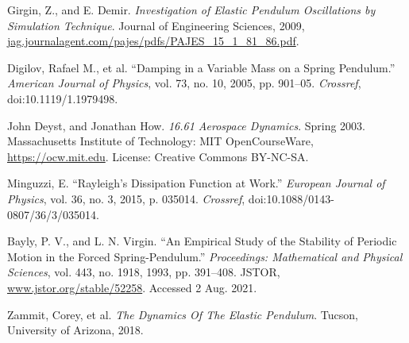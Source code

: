 
\begin{thebibliography}{99}

Girgin, Z., and E. Demir. \emph{Investigation of Elastic Pendulum Oscillations by Simulation Technique}. Journal of Engineering Sciences, 2009, \url{jag.journalagent.com/pajes/pdfs/PAJES_15_1_81_86.pdf}.

Digilov, Rafael M., et al. “Damping in a Variable Mass on a Spring Pendulum.” \emph{American Journal of Physics}, vol. 73, no. 10, 2005, pp. 901–05. \emph{Crossref}, doi:10.1119/1.1979498.

John Deyst, and Jonathan How. \emph{16.61 Aerospace Dynamics}. Spring 2003. Massachusetts Institute of Technology: MIT OpenCourseWare, \url{https://ocw.mit.edu}. License: Creative Commons BY-NC-SA.

Minguzzi, E. “Rayleigh’s Dissipation Function at Work.” \emph{European Journal of Physics}, vol. 36, no. 3, 2015, p. 035014. \emph{Crossref}, doi:10.1088/0143-0807/36/3/035014.

Bayly, P. V., and L. N. Virgin. “An Empirical Study of the Stability of Periodic Motion in the Forced Spring-Pendulum.” \emph{Proceedings: Mathematical and Physical Sciences}, vol. 443, no. 1918, 1993, pp. 391–408. JSTOR, \url{www.jstor.org/stable/52258}. Accessed 2 Aug. 2021.



Zammit, Corey, et al. \emph{The Dynamics Of The Elastic Pendulum}. Tucson, University of Arizona, 2018.




\end{thebibliography}
